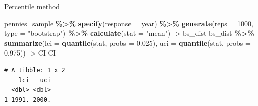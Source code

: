 \documentclass[
  ignorenonframetext,
]{beamer}
\newenvironment{Shaded}{\begin{snugshade}}{\end{snugshade}}
\newcommand{\AttributeTok}[1]{\textcolor[rgb]{0.13,0.29,0.53}{#1}}
\newcommand{\DecValTok}[1]{\textcolor[rgb]{0.00,0.00,0.81}{#1}}
\newcommand{\FloatTok}[1]{\textcolor[rgb]{0.00,0.00,0.81}{#1}}
\newcommand{\FunctionTok}[1]{\textcolor[rgb]{0.13,0.29,0.53}{\textbf{#1}}}
\newcommand{\NormalTok}[1]{#1}
\newcommand{\OtherTok}[1]{\textcolor[rgb]{0.56,0.35,0.01}{#1}}
\newcommand{\SpecialCharTok}[1]{\textcolor[rgb]{0.81,0.36,0.00}{\textbf{#1}}}
\newcommand{\StringTok}[1]{\textcolor[rgb]{0.31,0.60,0.02}{#1}}
\begin{document}
\begin{frame}[fragile]{Percentile method}
\label{percentile-method}
\small

\begin{Shaded}
\begin{Highlighting}[]
\NormalTok{pennies\_sample }\SpecialCharTok{\%\textgreater{}\%} 
  \FunctionTok{specify}\NormalTok{(}\AttributeTok{response =}\NormalTok{ year) }\SpecialCharTok{\%\textgreater{}\%} 
  \FunctionTok{generate}\NormalTok{(}\AttributeTok{reps =} \DecValTok{1000}\NormalTok{, }\AttributeTok{type =} \StringTok{"bootstrap"}\NormalTok{) }\SpecialCharTok{\%\textgreater{}\%} 
  \FunctionTok{calculate}\NormalTok{(}\AttributeTok{stat =} \StringTok{"mean"}\NormalTok{) }\OtherTok{{-}\textgreater{}}\NormalTok{ bs\_dist}
\NormalTok{bs\_dist }\SpecialCharTok{\%\textgreater{}\%} 
  \FunctionTok{summarize}\NormalTok{(}\AttributeTok{lci =} \FunctionTok{quantile}\NormalTok{(stat, }\AttributeTok{probs =} \FloatTok{0.025}\NormalTok{), }
            \AttributeTok{uci =} \FunctionTok{quantile}\NormalTok{(stat, }\AttributeTok{probs =} \FloatTok{0.975}\NormalTok{)) }\OtherTok{{-}\textgreater{}}\NormalTok{ CI}
\NormalTok{CI}
\end{Highlighting}
\end{Shaded}

\begin{verbatim}
# A tibble: 1 x 2
    lci   uci
  <dbl> <dbl>
1 1991. 2000.
\end{verbatim}

\normalsize
\end{frame}
\end{document}
